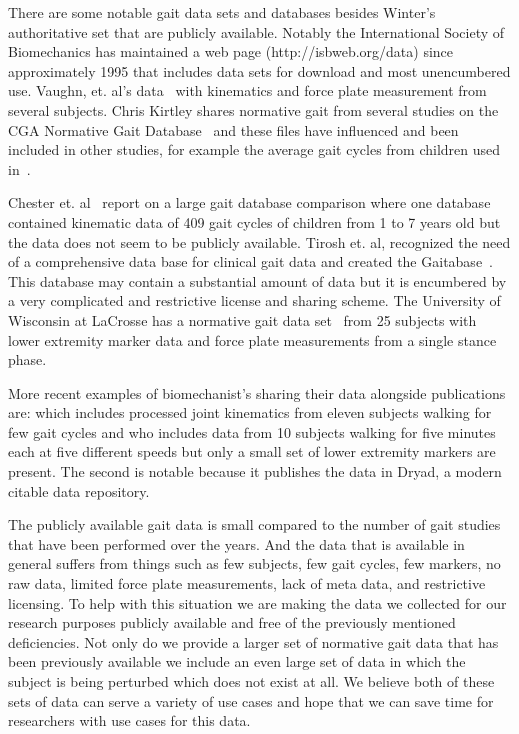 \documentclass[10pt,a4paper,twocolumn]{article}
\begin{document}
There are some notable gait data sets and databases besides Winter's authoritative
set that are publicly available. Notably the International Society of
Biomechanics has maintained a web page (http://isbweb.org/data) since
approximately 1995 that includes data sets for download and most unencumbered
use. Vaughn, et. al's data~\cite{Vaughan1992} with kinematics and force plate
measurement from several subjects. Chris Kirtley shares normative gait from
several studies on the CGA Normative Gait Database~\cite{Kirtley} and these
files have influenced and been included in other studies, for
example the average gait cycles from children used in~\cite{Bogert2003}.

Chester et. al~\cite{Chester2007} report on a large gait database comparison
where one database contained kinematic data of 409 gait cycles of children from
1 to 7 years old but the data does not seem to be publicly available. Tirosh
et. al, recognized the need of a comprehensive data base for clinical gait data
and created the Gaitabase~\cite{Tirosh2010}.  This database may contain a
substantial amount of data but it is encumbered by a very complicated and
restrictive license and sharing scheme. The University of Wisconsin at LaCrosse
has a normative gait data set~\cite{Wilson} from 25 subjects with lower
extremity marker data and force plate measurements from a single stance phase.

More recent examples of biomechanist's sharing their data alongside
publications are: \cite{Bogert2013} which includes processed joint kinematics
from eleven subjects walking for few gait cycles and \cite{Wang2014} who
includes data from 10 subjects walking for five minutes each at five different
speeds but only a small set of lower extremity markers are present. The second
is notable because it publishes the data in Dryad, a modern citable data
repository.

The publicly available gait data is small compared to the number of gait
studies that have been performed over the years. And the data that is available
in general suffers from things such as few subjects, few gait cycles, few
markers, no raw data, limited force plate measurements, lack of meta data, and
restrictive licensing. To help with this situation we are making the data we
collected for our research purposes publicly available and free of the
previously mentioned deficiencies. Not only do we provide a larger set of
normative gait data that has been previously available we include an even large
set of data in which the subject is being perturbed which does not exist at
all. We believe both of these sets of data can serve a variety of use cases and
hope that we can save time for researchers with use cases for this data.
\end{document}

